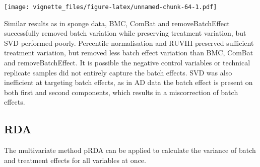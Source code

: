 \documentclass[]{book}
\begin{document}
\texttt{[image: vignette\_files/figure-latex/unnamed-chunk-64-1.pdf]}

Similar results as in sponge data, BMC, ComBat and removeBatchEffect
successfully removed batch variation while preserving treatment
variation, but SVD performed poorly. Percentile normalisation and RUVIII
preserved sufficient treatment variation, but removed less batch effect
variation than BMC, ComBat and removeBatchEffect. It is possible the
negative control variables or technical replicate samples did not
entirely capture the batch effects. SVD was also inefficient at
targeting batch effects, as in AD data the batch effect is present on
both first and second components, which results in a miscorrection of
batch effects.

\subsection{RDA}\label{rda}

The multivariate method pRDA can be applied to calculate the variance of
batch and treatment effects for all variables at once.
\end{document}
